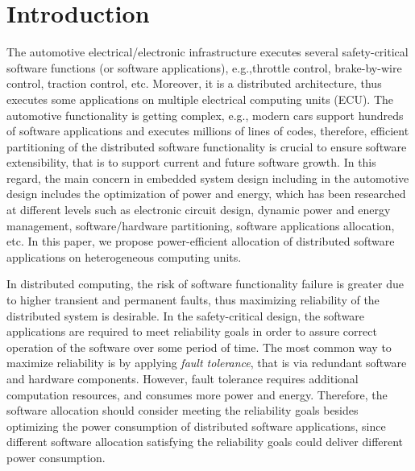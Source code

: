 \section{Introduction}
The automotive electrical/electronic infrastructure executes several safety-critical software functions (or software applications), e.g.,throttle control, brake-by-wire control, traction control, etc. Moreover, it is a distributed architecture, thus executes some applications on multiple electrical computing units (ECU). The automotive functionality is getting complex, e.g., modern cars support hundreds of software applications and executes millions of lines of codes, therefore, efficient partitioning of the distributed software functionality is crucial to ensure software extensibility, that is to support current and future software growth. In this regard, the main concern in embedded system design including in the automotive design includes the optimization of power and energy, which has been researched at different levels such as electronic circuit design, dynamic power and energy management, software/hardware partitioning, software applications allocation, etc. In this paper, we propose power-efficient allocation of distributed software applications on heterogeneous computing units.

In distributed computing, the risk of software functionality failure is greater due to higher transient and permanent faults, thus maximizing reliability of the distributed system is desirable. In the safety-critical design, the software applications are required to meet reliability goals in order to assure correct operation of the software over some period of time. The most common way to maximize reliability is by applying \textit{fault tolerance}, that is via redundant software and hardware components. However, fault tolerance requires additional computation resources, and consumes more power and energy. Therefore, the software allocation should consider meeting the reliability goals besides optimizing the power consumption of distributed software applications, since different software allocation satisfying the reliability goals could deliver different power consumption.

